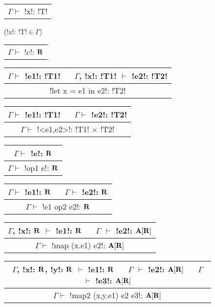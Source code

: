 \begin{figure*}[tb]
    \centering
    \begin{tabular}{c} 
    \\\hline
    $\Gamma \vdash$ !x!: !T!
    \end{tabular}(!x!: !T!$\in\Gamma$)
    \hspace{0.5cm}
    \begin{tabular}{c} 
        \\\hline
        $\Gamma \vdash$ !c!: $\mathbf{R}$
    \end{tabular}
    \hspace{0.5cm}
    \begin{tabular}{c}
    $\Gamma \vdash$ !e1!: !T1! $\quad$ $\Gamma$, !x!: !T1! $\vdash$ !e2!: !T2! \\\hline
    !let x = e1 in e2!: !T2!
    \end{tabular}

    \begin{tabular}{c}
    $\Gamma \vdash$ !e1!: !T1! $\quad$ $\Gamma \vdash$ !e2!: !T2! \\\hline  
    $\Gamma \vdash$ !<e1,e2>!: !T1! $\times$ !T2!
    \end{tabular}
    \hspace{0.5cm}
    \begin{tabular}{c}
        $\Gamma \vdash$ !e!: $\mathbf{R}$ \\\hline  
        $\Gamma \vdash$ !op1 e!: $\mathbf{R}$
    \end{tabular}
    \hspace{0.5cm}
    \begin{tabular}{c}
        $\Gamma \vdash$ !e1!: $\mathbf{R}$ $\quad$ $\Gamma \vdash$ !e2!: $\mathbf{R}$ \\\hline  
        $\Gamma \vdash$ !e1 op2 e2!: $\mathbf{R}$
        \end{tabular}
 
    \begin{tabular}{c}
        $\Gamma$, !x!: $\mathbf{R}$ $\vdash$ !e1!: $\mathbf{R}$ $\quad$ $\Gamma$ $\vdash$ !e2!: $\mathbf{A}[\mathbf{R}]$
        \\\hline  
        $\Gamma \vdash$ !map (x.e1) e2!: $\mathbf{A}[\mathbf{R}]$
    \end{tabular}

    \begin{tabular}{c}
        $\Gamma$, !x!: $\mathbf{R}$, !y!: $\mathbf{R}$ $\vdash$ !e1!: $\mathbf{R}$ 
        $\quad$ $\Gamma$ $\vdash$ !e2!: $\mathbf{A}[\mathbf{R}]$
        $\quad$ $\Gamma$ $\vdash$ !e3!: $\mathbf{A}[\mathbf{R}]$
        \\\hline  
        $\Gamma \vdash$ !map2 (x,y.e1) e2 e3!: $\mathbf{A}[\mathbf{R}]$
    \end{tabular}


\end{figure*}
